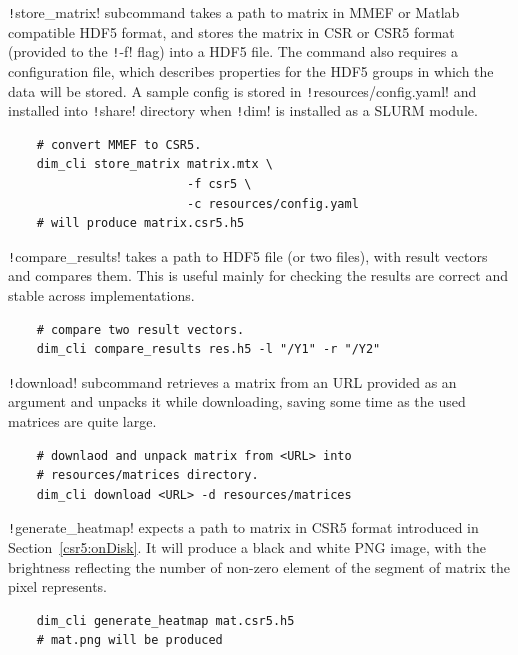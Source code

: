 \documentclass[thesis=M,english]{FITthesis}[2019/12/23]
\newcommand{\csre}[1]{\texttt!#1!}
\begin{document}
\csre{store_matrix} subcommand takes a path to matrix in MMEF or Matlab compatible HDF5 format, and stores
the matrix in CSR or CSR5 format (provided to the \csre{-f} flag) into a HDF5 file. The command also
requires a configuration file, which describes properties for the HDF5 groups in which the data will be
stored. A sample config is stored in \csre{resources/config.yaml} and installed into \csre{share} directory
when \csre{dim} is installed as a SLURM module.

\begin{verbatim}
    # convert MMEF to CSR5.
    dim_cli store_matrix matrix.mtx \
                         -f csr5 \
                         -c resources/config.yaml
    # will produce matrix.csr5.h5
\end{verbatim}

\csre{compare_results} takes a path to HDF5 file (or two files), with result vectors and compares them.
This is useful mainly for checking the results are correct and stable across implementations.

\begin{verbatim}
    # compare two result vectors.
    dim_cli compare_results res.h5 -l "/Y1" -r "/Y2"
\end{verbatim}

\csre{download} subcommand retrieves a matrix from an URL provided as an argument and unpacks it while
downloading, saving some time as the used matrices are quite large.

\begin{verbatim}
    # downlaod and unpack matrix from <URL> into 
    # resources/matrices directory.
    dim_cli download <URL> -d resources/matrices
\end{verbatim}

\csre{generate_heatmap} expects a path to matrix in CSR5 format introduced in Section~\ref{csr5:onDisk}.
It will produce a black and white PNG image, with the brightness reflecting the number of non-zero element
of the segment of matrix the pixel represents.

\begin{verbatim}
    dim_cli generate_heatmap mat.csr5.h5
    # mat.png will be produced
\end{verbatim}
\end{document}
